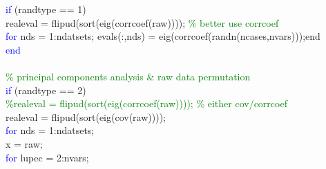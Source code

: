 \hspace{1mm}\indent \indent \indent \indent \indent \indent \indent \indent \textcolor{blue}{if} (randtype == 1) \\ 
\hspace{1mm}\indent \indent \indent \indent \indent \indent \indent \indent \indent realeval = flipud(sort(eig(corrcoef(raw))));    \textcolor{green}{\% better use corrcoef }\\ 
\hspace{1mm}\indent \indent \indent \indent \indent \indent \indent \indent \indent \textcolor{blue}{for} nds = 1:ndatsets; evals(:,nds) = eig(corrcoef(randn(ncases,nvars)));end \\ 
\hspace{1mm}\indent \indent \indent \indent \indent \indent \indent \indent \indent \textcolor{blue}{end} \\ 
\hspace{1mm}\indent \indent \indent \indent \indent \indent \indent \indent \indent  \\ 
\hspace{1mm}\indent \indent \indent \indent \indent \indent \indent \indent \indent \textcolor{green}{\% principal components analysis \& raw data permutation }\\ 
\hspace{1mm}\indent \indent \indent \indent \indent \indent \indent \indent \indent \textcolor{blue}{if} (randtype == 2) \\ 
\hspace{1mm}\indent \indent \indent \indent \indent \indent \indent \indent \indent \indent \textcolor{green}{\%realeval = flipud(sort(eig(corrcoef(raw))));    }\textcolor{green}{\% either cov/corrcoef }\\ 
\hspace{1mm}\indent \indent \indent \indent \indent \indent \indent \indent \indent \indent realeval = flipud(sort(eig(cov(raw)))); \\ 
\hspace{1mm}\indent \indent \indent \indent \indent \indent \indent \indent \indent \indent \textcolor{blue}{for} nds = 1:ndatsets;  \\ 
\hspace{1mm}\indent \indent \indent \indent \indent \indent \indent \indent \indent \indent \indent x = raw; \\ 
\hspace{1mm}\indent \indent \indent \indent \indent \indent \indent \indent \indent \indent \indent \textcolor{blue}{for} lupec = 2:nvars; \\ 
